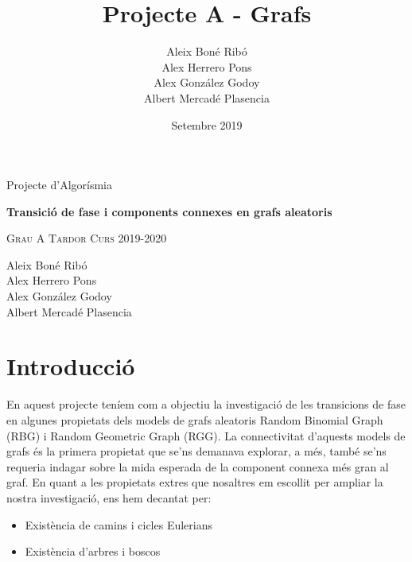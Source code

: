 



%

\title{Projecte A - Grafs}
\author{
Aleix Boné Ribó\\
Alex Herrero Pons\\
Alex González Godoy\\
Albert Mercadé Plasencia\\
}
\date{Setembre 2019}



\thispagestyle{empty}
\clearpage
\setcounter{page}{-1}

\begin{titlepage}
{
    \centering
    \null
    \vfill
    {\Large Projecte d'Algorísmia\par}
    \vspace{2em}
    {\Huge \bfseries 
    Transició de fase i components connexes en grafs aleatoris
    \par}
    \vspace{2em}
    {\large \scshape 
    Grau A \qquad Tardor Curs 2019-2020
    \par}
    \vfill
\begin{center}
    
\end{center}
    \vspace{3cm}

    \vfill
    {\raggedleft \large
Aleix Boné Ribó\\
Alex Herrero Pons\\
Alex González Godoy\\
Albert Mercadé Plasencia\\
        \par}
}
\end{titlepage}

\pagebreak
{} 

\tableofcontents
\pagebreak
{} 

\section{Introducció}
En aquest projecte teníem com a objectiu la investigació de les transicions de fase en algunes propietats dels models de grafs aleatoris Random Binomial Graph (RBG) i Random Geometric Graph (RGG). La connectivitat d'aquests models de grafs és la primera propietat que se'ns demanava explorar, a més, també se'ns requeria indagar sobre la mida esperada de la component connexa més gran al graf. En quant a les propietats extres que nosaltres em escollit per ampliar la nostra investigació, ens hem decantat per:
\begin{itemize}
    \item Existència de camins i cicles Eulerians
    \item Existència d'arbres i boscos
\end{itemize}

